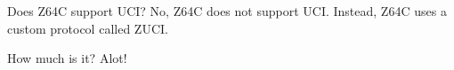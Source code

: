 \begin{faq}

\item[Does Z64C support UCI?]
No, Z64C does not support UCI. Instead, Z64C uses a custom protocol called ZUCI.

\item[How much is it?]
Alot!

\end{faq}
